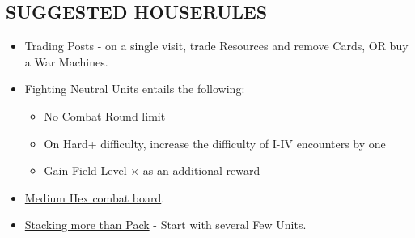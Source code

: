 \begin{multicols*}{2}
\subsection*{\MakeUppercase{Suggested Houserules}}
\begin{itemize}
  \item Trading Posts - on a single visit, trade Resources and remove Cards, OR buy a War Machines.
  \item Fighting Neutral Units entails the following:
  \begin{itemize}
    \item No Combat Round limit
    \item On Hard+ difficulty, increase the difficulty of I-IV encounters by one
    \item Gain Field Level ×  as an additional reward
  \end{itemize}
  \item \href{https://boardgamegeek.com/thread/3445901/custom-hex-combat-board}{Medium Hex combat board}.
  \item \href{https://boardgamegeek.com/thread/3449937/houserule-for-stacking-more-than-pack}{Stacking more than Pack} - Start with several Few  Units.
\end{itemize}

\vspace*{\fill}

\end{multicols*}

